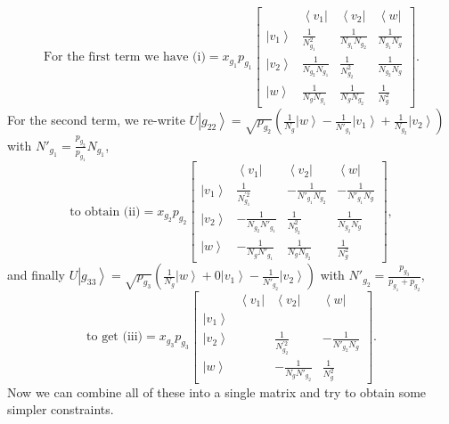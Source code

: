 \documentclass{article}
\begin{document}
\begin{displaymath}\text{For the first term we have }
\text{(i)}=x_{g_{1}}p_{g_{1}}\left[\begin{array}{c|ccc}
& \left\langle v_{1}\right| & \left\langle v_{2}\right| & \left\langle w\right|\\
\hline \left|v_{1}\right\rangle  & \frac{1}{N_{g_{1}}^{2}} & \frac{1}{N_{g_{1}}N_{g_{2}}} & \frac{1}{N_{g_{1}}N_{g}}\\
\left|v_{2}\right\rangle  & \frac{1}{N_{g_{2}}N_{g_{1}}} & \frac{1}{N_{g_{2}}^{2}} & \frac{1}{N_{g_{2}}N_{g}}\\
\left|w\right\rangle  & \frac{1}{N_{g}N_{g_{1}}} & \frac{1}{N_{g}N_{g_{2}}} & \frac{1}{N_{g}^{2}}
\end{array}\right].
\end{displaymath}
For the second term, we re-write $U\left|g_{22}\right\rangle =\sqrt{p_{g_{2}}}\left(\frac{1}{N_{g}}\left|w\right\rangle -\frac{1}{N'_{g_{1}}}\left|v_{1}\right\rangle +\frac{1}{N_{g_{2}}}\left|v_{2}\right\rangle \right)$
with 
$
N'_{g_{1}}=\frac{p_{g_{2}}}{p_{g_{1}}}N_{g_{1}}
$, \begin{displaymath}
\text{to obtain  (ii)}=x_{g_{2}}p_{g_{2}}\left[\begin{array}{c|ccc}
& \left\langle v_{1}\right| & \left\langle v_{2}\right| & \left\langle w\right|\\
\hline \left|v_{1}\right\rangle  & \frac{1}{N_{g_{1}}^{\prime2}} & -\frac{1}{N'_{g_{1}}N_{g_{2}}} & -\frac{1}{N'_{g_{1}}N_{g}}\\
\left|v_{2}\right\rangle  & -\frac{1}{N_{g_{2}}N'_{g_{1}}} & \frac{1}{N_{g_{2}}^{2}} & \frac{1}{N_{g_{2}}N_{g}}\\
\left|w\right\rangle  & -\frac{1}{N_{g}N'_{g_{1}}} & \frac{1}{N_{g}N_{g_{2}}} & \frac{1}{N_{g}^{2}}
\end{array}\right],
\end{displaymath}
and finally $U\left|g_{33}\right\rangle =\sqrt{p_{g_{3}}}\left(\frac{1}{N_{g}}\left|w\right\rangle +0\left|v_{1}\right\rangle -\frac{1}{N'_{g_{2}}}\left|v_{2}\right\rangle \right)$
with 
$
N'_{g_{2}}=\frac{p_{g_{3}}}{p_{g_{1}}+p_{g_{2}}}
$,\begin{displaymath}
\text{to get  (iii)}=x_{g_{3}}p_{g_{3}}\left[\begin{array}{c|ccc}
& \left\langle v_{1}\right| & \left\langle v_{2}\right| & \left\langle w\right|\\
\hline \left|v_{1}\right\rangle \\
\left|v_{2}\right\rangle  &  & \frac{1}{N_{g_{2}}^{\prime2}} & -\frac{1}{N'_{g_{2}}N_{g}}\\
\left|w\right\rangle  &  & -\frac{1}{N_{g}N'_{g_{2}}} & \frac{1}{N_{g}^{2}}
\end{array}\right].
\end{displaymath}
Now we can combine all of these into a single matrix and try to obtain
some simpler constraints.
\end{document}
